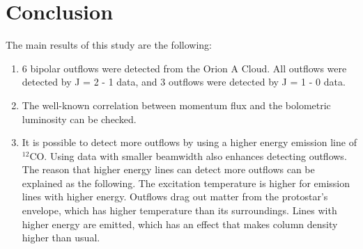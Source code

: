 \documentclass[twoside,11pt]{gshs_thesis}
\begin{document}
\section{Conclusion}
The main results of this study are the following:
\begin{enumerate}
	\item 6 bipolar outflows were detected from the Orion A Cloud. All outflows were detected by J = 2 - 1 data, and 3 outflows were detected by J = 1 - 0 data.\\
	
	\item The well-known correlation between momentum flux and the bolometric luminosity can be checked. \\
	
	\item It is possible to detect more outflows by using a higher energy emission line of $^{12}$CO. Using data with smaller beamwidth also enhances detecting outflows. The reason that higher energy lines can detect more outflows can be explained as the following. The excitation temperature is higher for emission lines with higher energy. Outflows drag out matter from the protostar's envelope, which has higher temperature than its surroundings. Lines with higher energy are emitted, which has an effect that makes column density higher than usual.\\
	
\end{enumerate}


\clearpage  %
\appendix
\renewcommand{\thesection}{\Alph{section}} %
\renewcommand{\thesubsection}{\arabic{subsection}}
\renewcommand{\thesubsubsection}{\arabic{subsubsection}}
\renewcommand{\theequation}{\thesection.\arabic{equation}} %
\renewcommand{\thefigure}{\thesection-\arabic{figure}} %
\renewcommand{\thetable}{\thesection-\arabic{table}} %
\setcounter{equation}{0} %
\setcounter{figure}{0} %
\setcounter{table}{0} %
\end{document}
